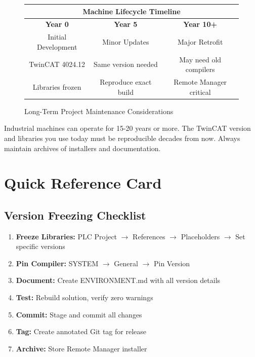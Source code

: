 \documentclass[11pt,a4paper]{article}
\begin{document}
\begin{figure}[h]
\centering
\begin{tabular}{|c|c|c|}
\hline
\multicolumn{3}{|c|}{\textbf{Machine Lifecycle Timeline}} \\
\hline
\textbf{Year 0} & \textbf{Year 5} & \textbf{Year 10+} \\
\hline
Initial Development & Minor Updates & Major Retrofit \\
TwinCAT 4024.12 & Same version needed & May need old compilers \\
Libraries frozen & Reproduce exact build & Remote Manager critical \\
\hline
\end{tabular}
\caption{Long-Term Project Maintenance Considerations}
\end{figure}

\begin{warningbox}
Industrial machines can operate for 15-20 years or more. The TwinCAT version and libraries you use today must be reproducible decades from now. Always maintain archives of installers and documentation.
\end{warningbox}

\section*{Quick Reference Card}

\subsection*{Version Freezing Checklist}

\begin{enumerate}
    \item \textbf{Freeze Libraries:} PLC Project $\rightarrow$ References $\rightarrow$ Placeholders $\rightarrow$ Set specific versions
    \item \textbf{Pin Compiler:} SYSTEM $\rightarrow$ General $\rightarrow$ Pin Version
    \item \textbf{Document:} Create ENVIRONMENT.md with all version details
    \item \textbf{Test:} Rebuild solution, verify zero warnings
    \item \textbf{Commit:} Stage and commit all changes
    \item \textbf{Tag:} Create annotated Git tag for release
    \item \textbf{Archive:} Store Remote Manager installer
\end{enumerate}
\end{document}

